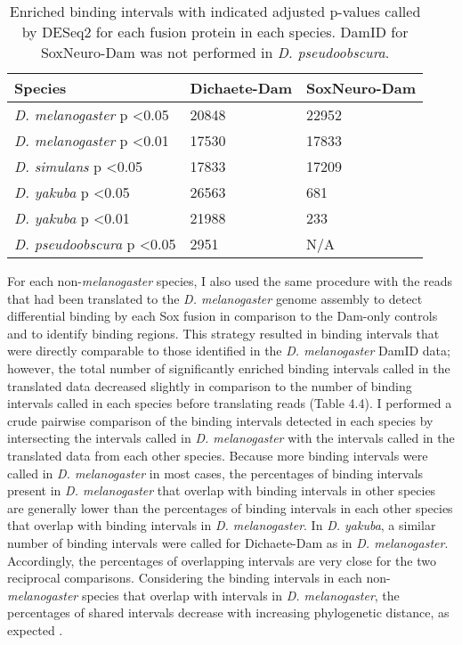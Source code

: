 \begin{table}[h]
\centering
\begin{tabular}{|l|l|l|}
\hline
\textbf{Species}                           & \textbf{Dichaete-Dam} & \textbf{SoxNeuro-Dam} \\ \hline
\emph{D. melanogaster} p \textless 0.05  & 20848        & 22952        \\ \hline
\emph{D. melanogaster} p \textless 0.01  & 17530        & 17833        \\ \hline
\emph{D. simulans} p \textless 0.05      & 17833        & 17209        \\ \hline
\emph{D. yakuba} p \textless 0.05        & 26563        & 681          \\ \hline
\emph{D. yakuba} p \textless 0.01        & 21988        & 233          \\ \hline
\emph{D. pseudoobscura} p \textless 0.05 & 2951         & N/A          \\ \hline
\end{tabular}
\caption{Enriched binding intervals with indicated adjusted p-values called by DESeq2 for each fusion protein in each species. DamID for SoxNeuro-Dam was not performed in \emph{D. pseudoobscura}.}
\label{Table 4.3}
\end{table}

For each non-\emph{melanogaster} species, I also used the same procedure with the reads that had been translated to the \emph{D. melanogaster} genome assembly to detect differential binding by each Sox fusion in comparison to the Dam-only controls and to identify binding regions. This strategy resulted in binding intervals that were directly comparable to those identified in the \emph{D. melanogaster} DamID data; however, the total number of significantly enriched binding intervals called in the translated data decreased slightly in comparison to the number of binding intervals called in each species before translating reads (Table 4.4). I performed a crude pairwise comparison of the binding intervals detected in each species by intersecting the intervals called in \emph{D. melanogaster} with the intervals called in the translated data from each other species. Because more binding intervals were called in \emph{D. melanogaster} in most cases, the percentages of binding intervals present in \emph{D. melanogaster} that overlap with binding intervals in other species are generally lower than the percentages of binding intervals in each other species that overlap with binding intervals in \emph{D. melanogaster}. In \emph{D. yakuba}, a similar number of binding intervals were called for Dichaete-Dam as in \emph{D. melanogaster}. Accordingly, the percentages of overlapping intervals are very close for the two reciprocal comparisons. Considering the binding intervals in each non-\emph{melanogaster} species that overlap with intervals in \emph{D. melanogaster}, the percentages of shared intervals decrease with increasing phylogenetic distance, as expected \citep{he_high_2011,paris_extensive_2013}.

